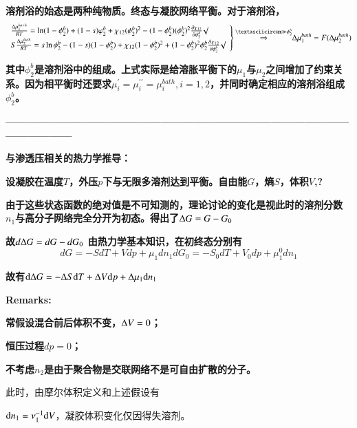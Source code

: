 \documentclass{article} %
\begin{document}
{\bf  溶剂浴的始态是两种纯物质。终态与凝胶网络平衡。对于溶剂浴，
\[\left. \begin{array}{l} {\frac{{\rm \Delta }\mu _{1}^{ba+h} }{RT} =\ln (1-\phi _{2}^{b} )+(1-s)\varphi _{2}^{b} +\chi _{12} (\phi _{2}^{b} )^{2} -(1-\phi _{2}^{b} )(\phi _{2}^{b} )^{2} \frac{\partial \chi _{12} }{\partial \phi _{2}^{b} } \mathrm{\surd }} \\ {S\frac{{\rm \Delta }\mu _{2}^{bath} }{RT} =s\ln \phi _{2}^{b} -(1-s)(1-\phi _{2}^{b} )+\chi _{12} (1-\phi _{2}^{b} )^{2} +(1-\phi _{2}^{b} )^{2} \phi _{2}^{b} \frac{\partial \chi _{1} {}_{2} }{\partial \phi _{2}^{b} } \mathrm{\surd }} \end{array}\right\}{\mathop{\Rightarrow }\limits^{ˆ\gg \phi _{2}^{b} }} {\rm \Delta }\mu _{1}^{bath} =F({\rm \Delta }\mu _{2}^{bath} )\] }

{\bf 其中$\phi _{2}^{b} $是溶剂浴中的组成。上式实际是给溶胀平衡下的$\mu _{1} $与$\mu _{2} $之间增加了约束关系。因为相平衡时还要求$\mu _{i}^{{'} } =\mu _{i}^{{'} {'} } =\mu _{i}^{bath} ,i=1,2$，并同时确定相应的溶剂浴组成$\phi _{2}^{b} $。}

\noindent 
{\bf ---------------------------------------------------------------------------------------------------------------}


{\bf  与渗透压相关的热力学推导：}

\noindent 
{\bf 设凝胶在温度$T$，外压$p$下与无限多溶剂达到平衡。自由能$G$，熵$S$，体积$V$,?}

\noindent 
{\bf 由于这些状态函数的绝对值是不可知测的，理论讨论的变化是视此时的溶剂分数$n_{1} $与高分子网络完全分开为初态。得出了${\rm \Delta }G=G-G_{0} $}

\noindent 
{\bf 故$d{\rm \Delta }G=dG-dG_{0} $  由热力学基本知识，在初终态分别有
\[dG=-SdT+Vdp+\mu _{1} dn_{1}    dG_{0} =-S_{0} dT+V_{0} dp+\mu _{1}^{0} dn_{1} \] }

{\bf 故有${\rm d\Delta }G=-{\rm \Delta }S{\rm d}T+{\rm \Delta }V{\rm d}p+{\rm \Delta }\mu _{1} {\rm d}n_{1} $}

\noindent 
{\bf Remarks:}


{\bf  常假设混合前后体积不变，${\rm \Delta }V=0$；}


{\bf  恒压过程$dp=0$；}


{\bf  不考虑$n_{2} $是由于聚合物是交联网络不是可自由扩散的分子。}

\noindent 此时，由摩尔体积定义和上述假设有

\noindent ${\rm d}n_{1} =\nu _{1}^{-1} {\rm d}V$，凝胶体积变化仅因得失溶剂。
\end{document}
